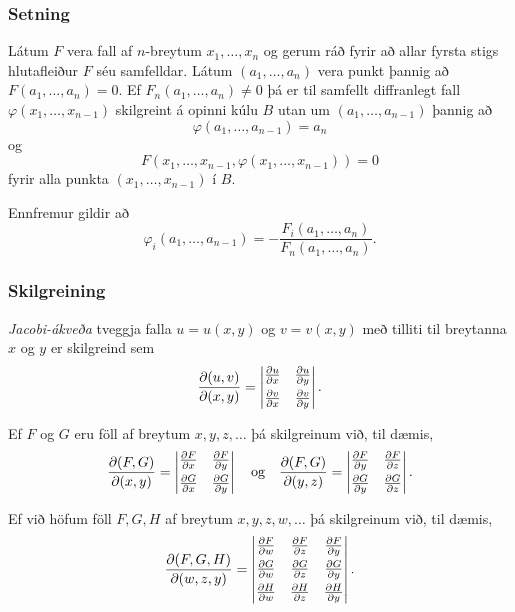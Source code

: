 \subsubsection{Setning }
Látum $F$ vera fall af $n$-breytum $x_1, \ldots,
x_n$ og gerum ráð fyrir að allar fyrsta stigs hlutafleiður  $F$ séu
samfelldar.   Látum $(a_1,\ldots,a_n)$ vera punkt þannig að 
$F(a_1,\ldots,a_n)=0$.  Ef $F_n(a_1,\ldots,a_n)\neq 0$ þá er til
samfellt diffranlegt fall $\varphi(x_1, \ldots, x_{n-1})$ skilgreint á 
opinni kúlu $B$
utan um $(a_1,\ldots,a_{n-1})$ þannig að 
$$\varphi(a_1,\ldots,a_{n-1})=a_n$$ 
og 
$$F(x_1,\ldots, x_{n-1}, \varphi(x_1, \ldots, x_{n-1}))=0$$
fyrir alla punkta $(x_1, \ldots, x_{n-1})$ í $B$.

Ennfremur gildir að 
$$\varphi_i(a_1,\ldots,a_{n-1})
=-\frac{F_i(a_1,\ldots,a_n)}{F_n(a_1,\ldots,a_n)}.$$ 



\subsubsection{Skilgreining }
  
{\em Jacobi-ákveða} tveggja falla $u=u(x,y)$ og $v=v(x,y)$ með
tilliti til breytanna $x$ og $y$ er skilgreind sem 
$$\frac{\partial(u,v)}{\partial(x,y)}=
\begin{vmatrix} 
\frac{\partial u}{\partial x}&\frac{\partial u}{\partial y}\\
\noalign{\smallskip}
\frac{\partial v}{\partial x}&\frac{\partial v}{\partial y}
\end{vmatrix}.$$



Ef $F$ og $G$ eru föll af breytum $x,y,z,\ldots$ þá skilgreinum við,
til dæmis,
$$\frac{\partial(F,G)}{\partial(x,y)}=
\begin{vmatrix} 
\frac{\partial F}{\partial x}&\frac{\partial F}{\partial y}\\
\noalign{\smallskip}
\frac{\partial G}{\partial x}&\frac{\partial G}{\partial y}
\end{vmatrix}\quad \mbox{og}\quad
\frac{\partial(F,G)}{\partial(y,z)}=
\begin{vmatrix} 
\frac{\partial F}{\partial y}&\frac{\partial F}{\partial z}\\
\noalign{\smallskip}
\frac{\partial G}{\partial y}&\frac{\partial G}{\partial z}
\end{vmatrix}.$$

Ef við höfum föll $F, G, H$ af breytum $x,y,z,w,\ldots$ þá
skilgreinum við, til dæmis,
$$\frac{\partial(F,G,H)}{\partial(w,z,y)}=
\begin{vmatrix} 
\frac{\partial F}{\partial w}&\frac{\partial F}{\partial z}
&\frac{\partial F}{\partial y}\\
\noalign{\smallskip}
\frac{\partial G}{\partial w}&\frac{\partial G}{\partial z}
&\frac{\partial G}{\partial y}\\
\noalign{\smallskip}
\frac{\partial H}{\partial w}&\frac{\partial H}{\partial z}
&\frac{\partial H}{\partial y}
\end{vmatrix}.$$




